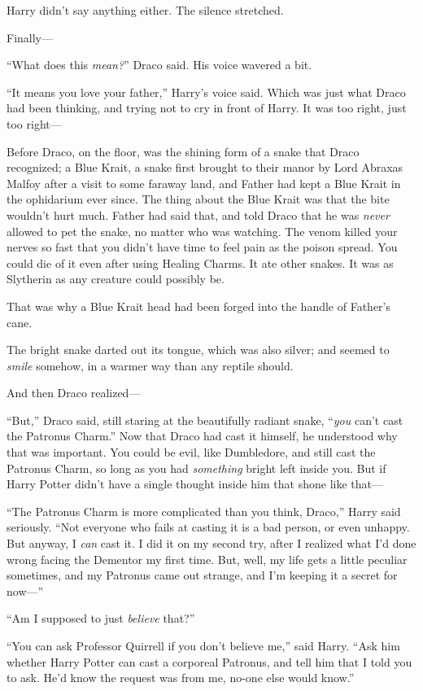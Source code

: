 Harry didn’t say anything either. The silence stretched.

Finally—

“What does this \emph{mean?}” Draco said. His voice wavered a bit.

“It means you love your father,” Harry’s voice said. Which was just what Draco had been thinking, and trying not to cry in front of Harry. It was too right, just too right—

Before Draco, on the floor, was the shining form of a snake that Draco recognized; a Blue Krait, a snake first brought to their manor by Lord Abraxas Malfoy after a visit to some faraway land, and Father had kept a Blue Krait in the ophidarium ever since. The thing about the Blue Krait was that the bite wouldn’t hurt much. Father had said that, and told Draco that he was \emph{never} allowed to pet the snake, no matter who was watching. The venom killed your nerves so fast that you didn’t have time to feel pain as the poison spread. You could die of it even after using Healing Charms. It ate other snakes. It was as Slytherin as any creature could possibly be.

That was why a Blue Krait head had been forged into the handle of Father’s cane.

The bright snake darted out its tongue, which was also silver; and seemed to \emph{smile} somehow, in a warmer way than any reptile should.

And then Draco realized—

“But,” Draco said, still staring at the beautifully radiant snake, “\emph{you} can’t cast the Patronus Charm.” Now that Draco had cast it himself, he understood why that was important. You could be evil, like Dumbledore, and still cast the Patronus Charm, so long as you had \emph{something} bright left inside you. But if Harry Potter didn’t have a single thought inside him that shone like that—

“The Patronus Charm is more complicated than you think, Draco,” Harry said seriously. “Not everyone who fails at casting it is a bad person, or even unhappy. But anyway, I \emph{can} cast it. I did it on my second try, after I realized what I’d done wrong facing the Dementor my first time. But, well, my life gets a little peculiar sometimes, and my Patronus came out strange, and I’m keeping it a secret for now—”

“Am I supposed to just \emph{believe} that?”

“You can ask Professor Quirrell if you don’t believe me,” said Harry. “Ask him whether Harry Potter can cast a corporeal Patronus, and tell him that I told you to ask. He’d know the request was from me, no-one else would know.”

